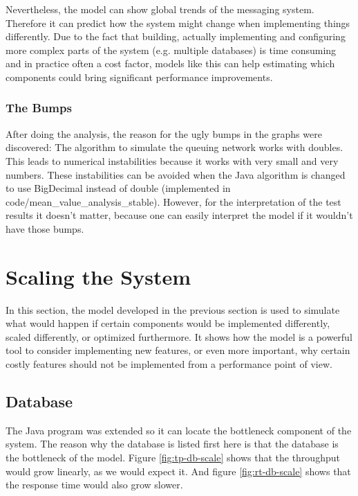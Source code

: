 \documentclass[a4paper]{article}
\begin{document}
Nevertheless, the model can show global trends of the messaging system. Therefore it can predict how the system might change when implementing things differently. Due to the fact that building, actually implementing and configuring more complex parts of the system (e.g. multiple databases) is time consuming and in practice often a cost factor, models like this can help estimating which components could bring significant performance improvements.\\

\subsubsection{The Bumps}

After doing the analysis, the reason for the ugly bumps in the graphs were discovered: The algorithm to simulate the queuing network works with doubles. This leads to numerical instabilities because it works with very small and very numbers. These instabilities can be avoided when the Java algorithm is changed to use BigDecimal instead of double (implemented in code/mean\_value\_analysis\_stable). However, for the interpretation of the test results it doesn't matter, because one can easily interpret the model if it wouldn't have those bumps.\\


\pagebreak

\section{Scaling the System}

In this section, the model developed in the previous section is used to simulate what would happen if certain components would be implemented differently, scaled differently, or optimized furthermore. It shows how the model is a powerful tool to consider implementing new features, or even more important, why certain costly features should not be implemented from a performance point of view.\\


\subsection{Database}

The Java program was extended so it can locate the bottleneck component of the system. The reason why the database is listed first here is that the database is the bottleneck of the model. Figure \ref{fig:tp-db-scale} shows that the throughput would grow linearly, as we would expect it. And figure \ref{fig:rt-db-scale} shows that the response time would also grow slower.\\
\end{document}
